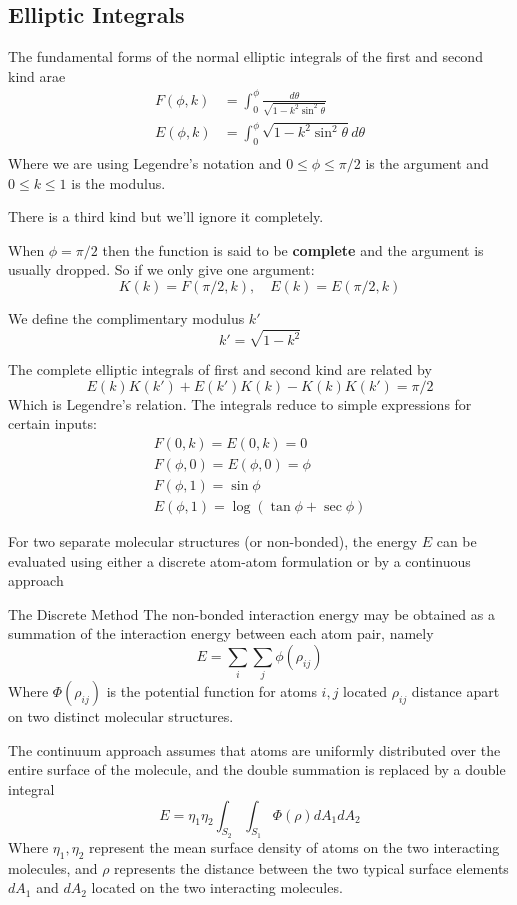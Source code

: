 \documentclass{E:/Documents/Latex/myassignment}
\begin{document}
\subsection{Elliptic Integrals}
The fundamental forms of the normal elliptic integrals of the first and second kind arae
\begin{align*}
	F(\phi,k) &= \int_0^\phi \frac{d\theta}{\sqrt{1-k^2\sin^2\theta}}\\
	E(\phi,k) &= \int_0^\phi \sqrt{1-k^2\sin^2\theta} d\theta\\
\end{align*}
Where we are using Legendre's notation and $0\leq \phi \leq \pi/2$ is the argument and $0\leq k \leq 1$ is the modulus.

There is a third kind but we'll ignore it completely.

When $\phi =\pi/2$ then the function is said to be \textbf{complete} and the argument is usually dropped. So if we only give one argument:
\[K(k) = F(\pi/2,k),\quad E(k) = E(\pi/2,k)\]

We define the complimentary modulus $k'$
\[k' = \sqrt{1-k^2}\]

The complete elliptic integrals of first and second kind are related by
\[E(k)K(k') + E(k') K(k) - K(k)K(k') = \pi/2\]
Which is Legendre's relation.
The integrals reduce to simple expressions for certain inputs:
\begin{align*}
	F(0,k) = E(0,k) = 0\\
	F(\phi,0) = E(\phi,0) = \phi\\
	F(\phi,1) = \sin\phi\\
	E(\phi,1) = \log(\tan\phi + \sec\phi) 
\end{align*}

For two separate molecular structures (or non-bonded), the energy $E$ can be evaluated using either a discrete atom-atom formulation or by a continuous approach

The Discrete Method
The non-bonded interaction energy may be obtained as a summation of the interaction energy between each atom pair, namely
\[E = \sum_i \sum_j \phi(\rho_{ij})\]
Where $\Phi(\rho_{ij})$ is the potential function for atoms $i,j$ located $\rho_{ij}$ distance apart on two distinct molecular structures. 

The continuum approach assumes that atoms are uniformly distributed over the entire surface of the molecule, and the double summation is replaced by a double integral
\[E = \eta_1 \eta_2 \int_{S_2} \int_{S_1} \Phi(\rho) dA_1 dA_2\]
Where $\eta_1,\eta_2$ represent the mean surface density of atoms on the two interacting molecules, and $\rho$ represents the distance between the two typical surface elements $dA_1$ and $dA_2$ located on the two interacting molecules.
\end{document}
